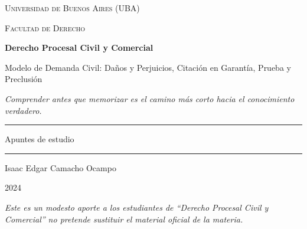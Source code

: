 \documentclass[12pt,oneside]{book}
\newcommand{\universidad}{Universidad de Buenos Aires (UBA)}
\newcommand{\facultad}{Facultad de Derecho}
\newcommand{\materia}{Derecho Procesal Civil y Comercial}
\newcommand{\titulo}{Modelo de Demanda Civil: Daños y Perjuicios, Citación en Garantía, Prueba y Preclusión}
\newcommand{\autor}{Isaac Edgar Camacho Ocampo}
\newcommand{\anio}{2024}
\begin{document}
\begin{titlepage}

\thispagestyle{empty}

\begin{center}

\vspace*{1cm}

{\large \textsc{\universidad}}

\vspace{0.2cm}

{\large \textsc{\facultad}}

\vspace{3cm}

{\Huge \textbf{\materia}}

\vspace{1cm}

{\LARGE \titulo}

\vspace{0.8cm}

\textit{Comprender antes que memorizar es el camino más corto hacia el conocimiento verdadero.}

\vspace{1.2cm}

\rule{0.70\textwidth}{0.5pt}

\vspace{0.5cm}

{\large Apuntes de estudio}

\vspace{0.5cm}

\rule{0.70\textwidth}{0.5pt}

\vfill

{\large \autor}

\vspace{0.3cm}

{\large \anio}

\end{center}

\vfill

\begin{flushleft}
\textit{Este es un modesto aporte a los estudiantes de ``Derecho Procesal Civil y Comercial'' no pretende sustituir el material oficial de la materia.}
\end{flushleft}

\end{titlepage}

\tableofcontents
\end{document}
